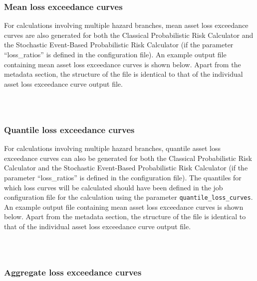 \subsubsection{Mean loss exceedance curves}
\label{subsubsec:mean_loss_curves}

For calculations involving multiple hazard branches, mean asset loss
exceedance curves are also generated for both the Classical Probabilistic Risk
Calculator and the Stochastic Event-Based Probabilistic Risk Calculator (if
the parameter ``loss\_ratios'' is defined in the configuration file). An
example output file containing mean asset loss exceedance curves is shown
below. Apart from the metadata section, the structure of the file is identical
to that of the individual asset loss exceedance curve output file.

\inputminted[firstline=1,firstnumber=1,fontsize=\footnotesize,frame=single,bgcolor=lightgray]{xml}{oqum/risk/verbatim/output_loss_curve_mean.xml}\\

\subsubsection{Quantile loss exceedance curves}
\label{subsubsec:quantile_loss_curves}

For calculations involving multiple hazard branches, quantile asset loss
exceedance curves can also be generated for both the Classical Probabilistic
Risk Calculator and the Stochastic Event-Based Probabilistic Risk Calculator
(if the parameter ``loss\_ratios'' is defined in the configuration file). The
quantiles for which loss curves will be calculated should have been defined in
the job configuration file for the calculation using the parameter
\Verb+quantile_loss_curves+. An example output file containing mean asset loss
exceedance curves is shown below. Apart from the metadata section, the
structure of the file is identical to that of the individual asset loss
exceedance curve output file.

\inputminted[firstline=1,firstnumber=1,fontsize=\footnotesize,frame=single,bgcolor=lightgray]{xml}{oqum/risk/verbatim/output_loss_curve_quantile.xml}\\

\subsubsection{Aggregate loss exceedance curves}
\label{subsubsec:aggregate_loss_curves}

